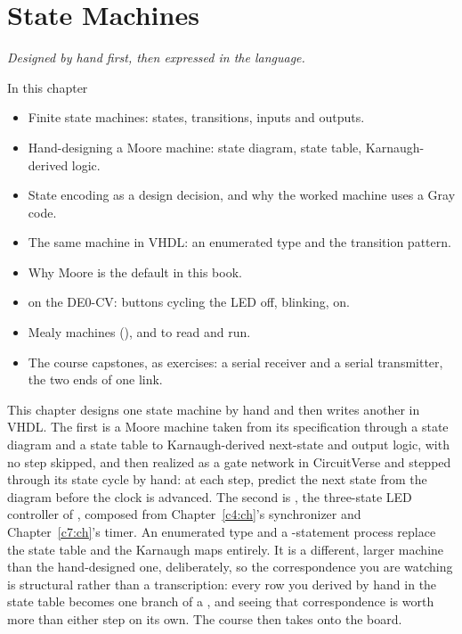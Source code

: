 
\chapter{State Machines}
\label{c8:ch}

{\large\itshape Designed by hand first, then expressed in the language.\par}

\begin{chapterbox}{In this chapter}
\begin{itemize}
  \item Finite state machines: states, transitions, inputs and outputs.
  \item Hand-designing a Moore machine: state diagram, state table, Karnaugh-derived logic.
  \item State encoding as a design decision, and why the worked machine uses a Gray code.
  \item The same machine in VHDL: an enumerated type and the  transition pattern.
  \item Why Moore is the default in this book.
  \item {} on the DE0-CV: buttons cycling the LED off, blinking, on.
  \item Mealy machines (), and  to read and run.
  \item The course capstones, as exercises: a serial receiver and a serial transmitter, the two ends
    of one link.
\end{itemize}
\end{chapterbox}

This chapter designs one state machine by hand and then writes another in VHDL. The first is a
Moore machine taken from its specification through a state diagram and a state table to
Karnaugh-derived next-state and output logic, with no step skipped, and then realized as a gate
network in CircuitVerse and stepped through its state cycle by hand: at each step, predict the next
state from the diagram before the clock is advanced. The second is , the three-state
LED controller of , composed from Chapter~\ref{c4:ch}'s synchronizer and
Chapter~\ref{c7:ch}'s timer. An enumerated  type and a -statement process
replace the state table and the Karnaugh maps entirely. It is a different, larger machine than the
hand-designed one, deliberately, so the correspondence you are watching is structural rather than a
transcription: every row you derived by hand in the state table becomes one branch of a
, and seeing that correspondence is worth more than either step on its own. The course
then takes  onto the board.

